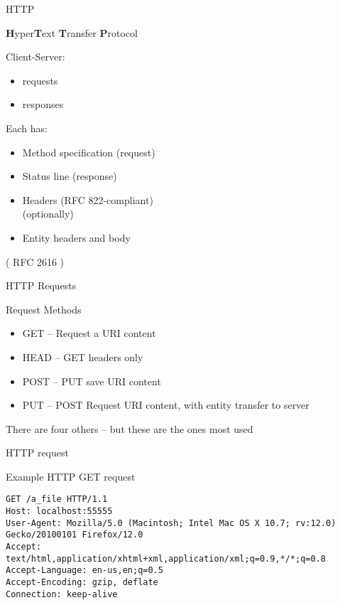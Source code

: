 \documentclass{beamer}
\begin{document}
\begin{frame}[fragile]{HTTP}

{\LARGE {\bf H}yper{\bf T}ext {\bf T}ransfer {\bf P}rotocol}

 {\Large Client-Server: }

\begin{itemize}
  \item requests
  \item responses
\end{itemize}

{\Large Each has:}

\begin{itemize}
  \item Method specification (request)
  \item Status line (response)
  \item  Headers (RFC 822-compliant)\\[0.1in]
  (optionally)
  \item Entity headers and body
\end{itemize}
 
\vfill
 ( RFC 2616 )

\end{frame} 

\begin{frame}{HTTP Requests}

{\Large Request Methods  }

\begin{itemize}
  \item GET  -- Request a URI content
  \item HEAD -- GET headers only
  \item POST -- PUT save URI content
  \item PUT  -- POST Request URI content, with entity transfer to server
\end{itemize}

\vfill
There are four others -- but these are the ones most used
\end{frame}

\begin{frame}[fragile]{HTTP request}

{\Large Example HTTP GET request}
\begin{verbatim}
GET /a_file HTTP/1.1
Host: localhost:55555
User-Agent: Mozilla/5.0 (Macintosh; Intel Mac OS X 10.7; rv:12.0) Gecko/20100101 Firefox/12.0
Accept: text/html,application/xhtml+xml,application/xml;q=0.9,*/*;q=0.8
Accept-Language: en-us,en;q=0.5
Accept-Encoding: gzip, deflate
Connection: keep-alive
\end{verbatim}

\end{frame}
\end{document}

